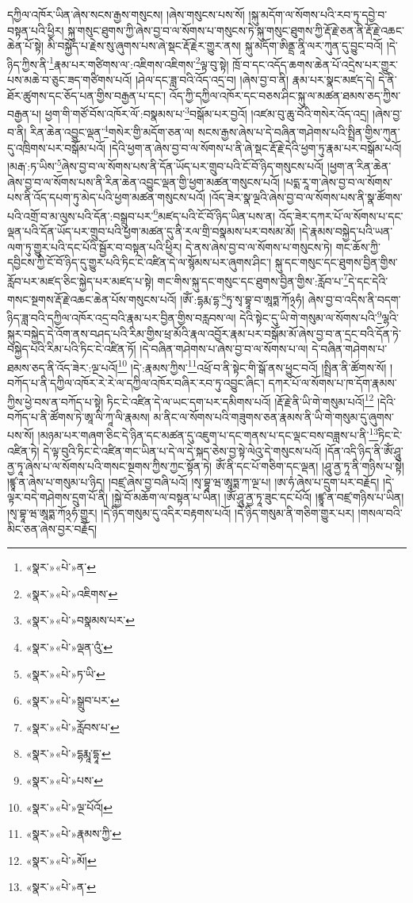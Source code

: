 དཀྱིལ་འཁོར་ཡིན་ཞེས་སངས་རྒྱས་གསུངས། །ཞེས་གསུངས་པས་སོ། །སྐུ་མདོག་ལ་སོགས་པའི་རབ་ཏུ་དབྱེ་བ་བསྟན་པའི་ཕྱིར། སྐུ་གསུང་ཐུགས་ཀྱི་ཞེས་བྱ་བ་ལ་སོགས་པ་གསུངས་ཏེ་སྐུ་གསུང་ཐུགས་ཀྱི་རྡོ་རྗེ་ཅན་ནི་རྡོ་རྗེ་འཆང་ཆེན་པོ་སྟེ། མི་བསྐྱོད་པ་རྗེས་སུ་ཞུགས་པས་ཞེ་སྡང་རྡོ་རྗེར་གྱུར་ནས། སྐུ་མདོག་ཨིནྡྲ་ནཱི་ལར་ཀུན་དུ་བྱུང་བའོ། །དེ་ཉིད་ཀྱིས་ནི་\footnote{«སྣར་»«པེ་»ན་}རྣམ་པར་གཙིགས་ལ་:འཇིགས་འཇིགས་\footnote{«སྣར་»«པེ་»འཇིགས་}ལྟ་བུ་སྟེ། ཁྲོ་བ་དང་འདོད་ཆགས་ཆེན་པོ་འདྲེས་པར་གྱུར་པས་མཆེ་བ་ཅུང་ཟད་གཙིགས་པའོ། །ཤེལ་དང་ཟླ་བའི་འོད་འདྲ་བ། །ཞེས་བྱ་བ་ནི། རྣམ་པར་སྣང་མཛད་དེ། དེ་ནི་ཐོར་ཚུགས་དང་ཅོད་པན་གྱིས་བརྒྱན་པ་དང་། འོད་ཀྱི་དཀྱིལ་འཁོར་དང་བཅས་ཤིང་སྐུ་ལ་མཚན་ཐམས་ཅད་ཀྱིས་བརྒྱན་པ། ཕྱག་གི་གཙོ་བོས་འཁོར་ལོ་:བསྣམས་པ་\footnote{«སྣར་»«པེ་»བསྣམས་པར་}བསྒོམ་པར་བྱའོ། །འཛམ་བུ་ཆུ་བོའི་གསེར་འོད་འདྲ། །ཞེས་བྱ་བ་ནི། རིན་ཆེན་འབྱུང་ལྡན་\footnote{«སྣར་»«པེ་»ལྡན་འུཾ་}གསེར་གྱི་མདོག་ཅན་ལ། སངས་རྒྱས་ཞེས་པ་དེ་བཞིན་གཤེགས་པའི་སྤྲིན་གྱིས་ཀུན་དུ་འཁྲིགས་པར་བསྒོམ་པའོ། །དེའི་ཕྱག་ན་ཞེས་བྱ་བ་ལ་སོགས་པ་ནི་ཞེ་སྡང་རྡོ་རྗེ་དེའི་ཕྱག་ཏུ་རྣམ་པར་བསྒོམ་པའོ། །མརྒ་:ཏ་ཡིས་\footnote{«སྣར་»«པེ་»ཏ་ཡི་}ཞེས་བྱ་བ་ལ་སོགས་པས་ནི་དོན་ཡོད་པར་གྲུབ་པའི་ངོ་བོ་ཉིད་གསུངས་པའོ། །ཕྱག་ན་རིན་ཆེན་ཞེས་བྱ་བ་ལ་སོགས་པས་ནི་རིན་ཆེན་འབྱུང་ལྡན་གྱི་ཕྱག་མཚན་གསུངས་པའོ། །པདྨ་རཱ་ག་ཞེས་བྱ་བ་ལ་སོགས་པས་ནི་འོད་དཔག་ཏུ་མེད་པའི་ཕྱག་མཚན་གསུངས་པའོ། །འོད་ཟེར་སྣ་ལྔའི་ཞེས་བྱ་བ་ལ་སོགས་པས་ནི་སྣ་ཚོགས་པའི་འགྲོ་བ་མ་ལུས་པའི་དོན་:བསྒྲུབ་པར་\footnote{«སྣར་»«པེ་»སྒྲུབ་པར་}མཛད་པའི་ངོ་བོ་ཉིད་ཡིན་པས་ན། འོད་ཟེར་དཀར་པོ་ལ་སོགས་པ་དང་ལྡན་པའི་དོན་ཡོད་པར་གྲུབ་པའི་ཕྱག་མཚན་དུ་ནི་རལ་གྲི་བསྣམས་པར་བསམ་མོ། །དེ་རྣམས་བསྐྱེད་པའི་ཡན་ལག་ཏུ་གྱུར་པའི་དང་པོའི་སྦྱོར་བ་བསྟན་པའི་ཕྱིར། དེ་ནས་ཞེས་བྱ་བ་ལ་སོགས་པ་གསུངས་ཏེ། གང་ཆོས་ཀྱི་དབྱིངས་ཀྱི་ངོ་བོ་ཉིད་དུ་གྱུར་པའི་ཏིང་ངེ་འཛིན་དེ་ལ་སྙོམས་པར་ཞུགས་ཤིང་། སྐུ་དང་གསུང་དང་ཐུགས་བྱིན་གྱིས་རློབ་པར་མཛད་ཅིང་སྐྱེད་པར་མཛད་པ་སྟེ། གང་གིས་སྐུ་དང་གསུང་དང་ཐུགས་བྱིན་གྱིས་:རློབ་པ་\footnote{«སྣར་»«པེ་»རློབས་པ་}དེ་དང་དེའི་གསང་སྔགས་རྡོ་རྗེ་འཆང་ཆེན་པོས་གསུངས་པའོ། །ཨོཾ་:དྷརྨ་དྷ་\footnote{«སྣར་»«པེ་»དྷརྨཱ་དྷཱ་}ཏུ་སྭ་བྷཱ་བ་ཨཱཏྨ་ཀོ྅ཧཾ། ཞེས་བྱ་བ་འདིས་ནི་བདག་ཉིད་ཟླ་བའི་དཀྱིལ་འཁོར་འདྲ་བའི་རྣམ་པར་བྱིན་གྱིས་བརླབས་ལ། དེའི་སྟེང་དུ་ཡི་གེ་གསུམ་ལ་སོགས་པའི་\footnote{«སྣར་»«པེ་»པས་}ལྷའི་སྐུར་བསྐྱེད་དེ་འོག་ནས་བཤད་པའི་རིམ་གྱིས་ཕྲ་མོའི་རྣལ་འབྱོར་རྣམ་པར་བསྒོམ་མོ་ཞེས་བྱ་བ་ན་དྲང་བའི་དོན་ཏེ་བསྐྱེད་པའི་རིམ་པའི་ཏིང་ངེ་འཛིན་ཏོ། །དེ་བཞིན་གཤེགས་པ་ཞེས་བྱ་བ་ལ་སོགས་པ་ལ། དེ་བཞིན་གཤེགས་པ་ཐམས་ཅད་ནི་འོད་ཟེར་:ལྔ་པའོ།\footnote{«སྣར་»«པེ་»ལྔ་པོའོ།} །དེ་:རྣམས་ཀྱིས་\footnote{«སྣར་»«པེ་»རྣམས་ཀྱི་}འཕྲོ་བ་ནི་སྟེང་གི་སྒོ་ནས་ཕྱུང་བའོ། །སྤྲིན་ནི་ཚོགས་སོ། །བཀོད་པ་ནི་དཀྱིལ་འཁོར་རེ་རེ་ལ་དཀྱིལ་འཁོར་བཞིར་རབ་ཏུ་འབྱུང་ཞིང་། དཀར་པོ་ལ་སོགས་པ་ཁ་དོག་རྣམས་ཀྱིས་ཕྱེ་བས་ན་བཀོད་པ་སྟེ། ཏིང་ངེ་འཛིན་དེ་ལ་ཡང་དག་པར་དམིགས་པའོ། །རྡོ་རྗེ་ནི་ཡི་གེ་གསུམ་པའོ།\footnote{«སྣར་»«པེ་»མོ།} །དེའི་བཀོད་པ་ནི་ཚོགས་ཏེ་ཨཱ་ལི་ཀཱ་ལི་རྣམས། མ་ནིང་ལ་སོགས་པའི་གཟུགས་ཅན་རྣམས་ནི་ཡི་གེ་གསུམ་དུ་ཞུགས་པས་སོ། །མཉམ་པར་གཞག་ཅིང་དེ་ཉིན་དང་མཚན་དུ་འཇུག་པ་དང་གནས་པ་དང་ལྡང་བས་བཟླས་པ་ནི་\footnote{«སྣར་»«པེ་»ན་}ཏིང་ངེ་འཛིན་ཏེ། དེ་ལྟ་བུའི་ཏིང་ངེ་འཛིན་གང་ཡིན་པ་དེ་ལ་དེ་སྐད་ཅེས་བྱ་སྟེ་ལེའུ་དེ་གསུངས་པའོ། །དོན་འདི་ཉིད་ནི་ཨོཾ་ཤཱུ་ནྱ་ཏཱ་ཞེས་པ་ལ་སོགས་པའི་གསང་སྔགས་ཀྱིས་ཀྱང་སྟོན་ཏེ། ཨོཾ་ནི་དང་པོ་གཅིག་དང་ལྡན། །ཤཱུ་ནྱ་ཏཱ་ནི་གཉིས་པ་སྟེ། །ཛྙཱ་ན་ཞེས་པ་གསུམ་པ་ཉིད། །བཛྲ་ཞེས་བྱ་བཞི་པའོ། །སྭ་བྷཱ་ཝ་ཨཱཏྨ་ཀ་ལྔ་པ། །ཨ་ཧཾ་ཞེས་པ་དྲུག་པར་བརྗོད། །དེ་ལྟར་བདེ་གཤེགས་དྲུག་པོ་ནི། །སྐྱེ་བོ་མཆོག་ལ་བསྟན་པ་ཡིན། །ཨོཾ་ཤཱུ་ནྱ་ཏཱ་ཟུང་དང་པོའོ། །ཛྙཱ་ན་བཛྲ་གཉིས་པ་ཡིན། །སྭ་བྷཱ་ཝ་ཨཱཏྨ་ཀོ྅ཧཾ་གྱུར། །དེ་ཉིད་གསུམ་དུ་འདིར་བརྟགས་པའོ། །དེ་ཉིད་གསུམ་ནི་གཅིག་གྱུར་པར། །གསལ་བའི་མིང་ཅན་ཞེས་བྱར་བརྗོད། 